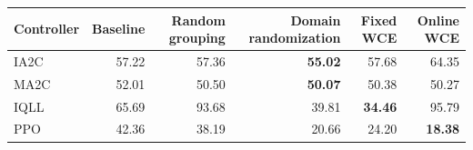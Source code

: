 \begin{tabular}{lrrrrr}
\hline
Controller & Baseline & Random grouping & Domain randomization & Fixed WCE & Online WCE \\
\hline
IA2C & 57.22 & 57.36 & \textbf{55.02} & 57.68 & 64.35 \\
MA2C & 52.01 & 50.50 & \textbf{50.07} & 50.38 & 50.27 \\
IQLL & 65.69 & 93.68 & 39.81 & \textbf{34.46} & 95.79 \\
PPO & 42.36 & 38.19 & 20.66 & 24.20 & \textbf{18.38} \\
\hline
\end{tabular}
